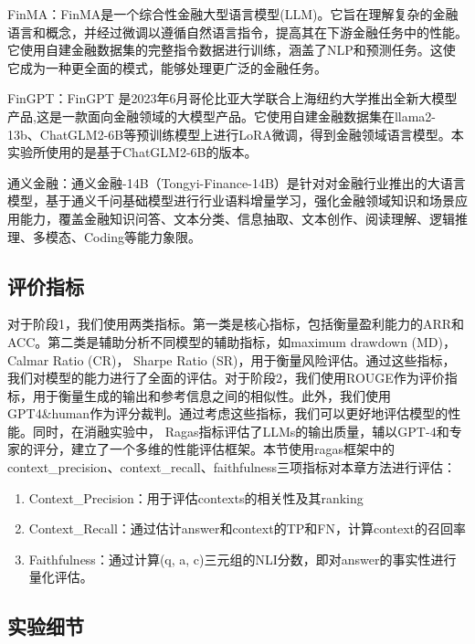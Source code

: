 FinMA：FinMA是一个综合性金融大型语言模型(LLM)。它旨在理解复杂的金融语言和概念，并经过微调以遵循自然语言指令，提高其在下游金融任务中的性能。它使用自建金融数据集的完整指令数据进行训练，涵盖了NLP和预测任务。这使它成为一种更全面的模式，能够处理更广泛的金融任务。

FinGPT：FinGPT 是2023年6月哥伦比亚大学联合上海纽约大学推出全新大模型产品,这是一款面向金融领域的大模型产品。它使用自建金融数据集在llama2-13b、ChatGLM2-6B等预训练模型上进行LoRA微调，得到金融领域语言模型。本实验所使用的是基于ChatGLM2-6B的版本。

通义金融：通义金融-14B（Tongyi-Finance-14B）是针对对金融行业推出的大语言模型，基于通义千问基础模型进行行业语料增量学习，强化金融领域知识和场景应用能力，覆盖金融知识问答、文本分类、信息抽取、文本创作、阅读理解、逻辑推理、多模态、Coding等能力象限。

\subsection{评价指标}

对于阶段1，我们使用两类指标。第一类是核心指标，包括衡量盈利能力的ARR和ACC。第二类是辅助分析不同模型的辅助指标，如maximum drawdown (MD)， Calmar Ratio (CR)， Sharpe Ratio (SR)，用于衡量风险评估。通过这些指标，我们对模型的能力进行了全面的评估。对于阶段2，我们使用ROUGE作为评价指标，用于衡量生成的输出和参考信息之间的相似性。此外，我们使用GPT4\&human作为评分裁判。通过考虑这些指标，我们可以更好地评估模型的性能。同时，在消融实验中， 
Ragas\cite{DBLP:conf/eacl/ESJAS24}指标评估了LLMs的输出质量，辅以GPT-4和专家的评分，建立了一个多维的性能评估框架。本节使用ragas框架中的context\_precision、context\_recall、faithfulness三项指标对本章方法进行评估：

\begin{enumerate}[topsep = 0 pt, itemsep= 0 pt, parsep=0pt, partopsep=0pt, leftmargin=0pt, itemindent=44pt, labelsep=6pt, listparindent=24pt, label=\arabic*)]
	\item Context\_Precision：用于评估contexts的相关性及其ranking
	\item Context\_Recall：通过估计answer和context的TP和FN，计算context的召回率
	\item Faithfulness：通过计算(q, a, c)三元组的NLI分数，即对answer的事实性进行量化评估。
\end{enumerate}

\subsection{实验细节}

